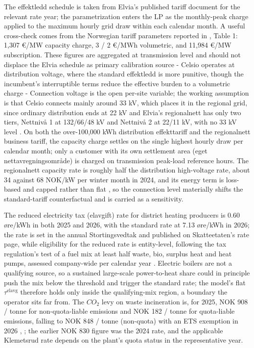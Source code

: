 The effektledd schedule is taken from Elvia's published tariff document for the relevant rate year; the parametrization enters the LP as the monthly-peak charge applied to the maximum hourly grid draw within each calendar month. A useful cross-check comes from the Norwegian tariff parameters reported in \cite{bergaentzle_cross-sector_2022}, Table 1: 1,307 €/MW capacity charge, 3 / 2 €/MWh volumetric, and 11,984 €/MW subscription. These figures are aggregated at transmission level and should not displace the Elvia schedule as primary calibration source - Celsio operates at distribution voltage, where the standard effektledd is more punitive, though the incumbent's interruptible terms reduce the effective burden to a volumetric charge - Connection voltage is the open per-site variable; the working assumption is that Celsio connects mainly around 33 kV, which places it in the regional grid, since ordinary distribution ends at 22 kV and Elvia's regionalnett has only two tiers, Nettnivå 1 at 132/66/48 kV and Nettnivå 2 at 22/11 kV, with no 33 kV level \cite{elvia_dagens_2022}. On both the over-100{,}000 kWh distribution effekttariff and the regionalnett business tariff, the capacity charge settles on the single highest hourly draw per calendar month; only a customer with its own settlement area (eget nettavregningsområde) is charged on transmission peak-load reference hours. The regionalnett capacity rate is roughly half the distribution high-voltage rate, about 34 against 68 NOK/kW per winter month in 2024, and its energy term is loss-based and capped rather than flat \cite{elvia_dagens_2022}, so the connection level materially shifts the standard-tariff counterfactual and is carried as a sensitivity.

The reduced electricity tax (elavgift) rate for district heating producers is 0.60 øre/kWh in both 2025 and 2026, with the standard rate at 7.13 øre/kWh in 2026; the rate is set in the annual Stortingsvedtak and published on Skatteetaten's rate page, while eligibility for the reduced rate is entity-level, following the tax regulation's test of a fuel mix at least half waste, bio, surplus heat and heat pumps, assessed company-wide per calendar year \cite{the_norwegian_tax_administration_arsrundskriv_nodate}. Electric boilers are not a qualifying source, so a sustained large-scale power-to-heat share could in principle push the mix below the threshold and trigger the standard rate; the model's flat $\tau^{\text{elavg}}$ therefore holds only inside the qualifying-mix region, a boundary the operator sits far from. The $CO_2$ levy on waste incineration is, for 2025, NOK 908 / tonne for non-quota-liable emissions and NOK 182 / tonne for quota-liable emissions, falling to NOK 848 / tonne (non-quota) with an ETS exemption in 2026 \cite{stortinget_avfallsforbrenning_2025}, \cite{stortinget_stortingsvedtak_2025}; the earlier NOK 830 figure was the 2024 rate, and the applicable Klemetsrud rate depends on the plant's quota status in the representative year.


